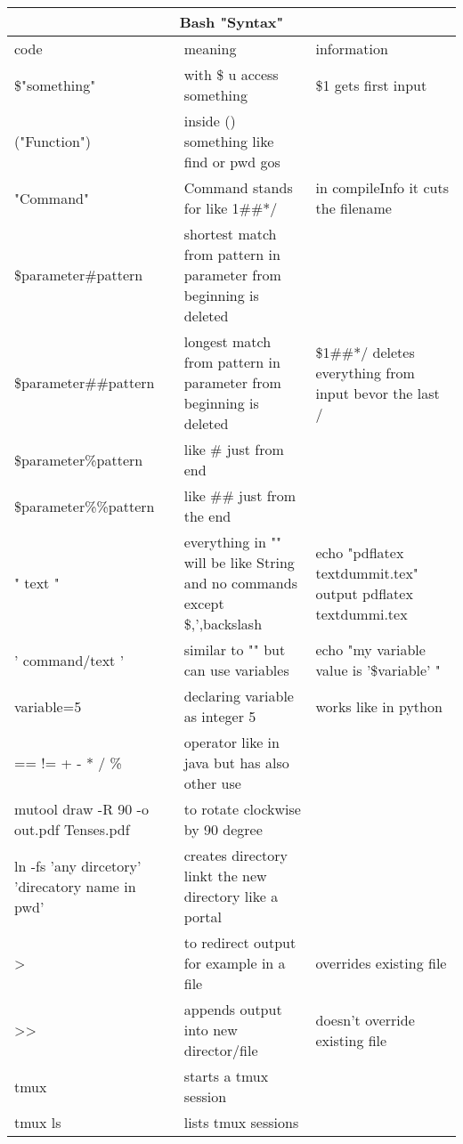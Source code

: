 \documentclass[12pt]{article}
\begin{document}
\centering
\begin{tabular}{| p{6.5cm} | p{6.5cm} | p{6.5cm} |}
    \hline
    \multicolumn{3}{|c|}{Bash "Syntax"} \\
    \hline
    code & meaning & information\\
    \hline
    \$"something" & with \$ u access something & \$1 gets first input\\
    \hline
    ("Function") & inside () something like find or pwd gos &\\
    \hline
    {"Command"} & Command stands for like 1\#\#*/ & in compileInfo it cuts the filename \\
    \hline
    \${parameter\#pattern} & shortest match from pattern in parameter from beginning is deleted &\\
    \hline 
    \${parameter\#\#pattern} & longest match from pattern in parameter from beginning is deleted & \${1\#\#*/} deletes everything from input bevor the last / \\
    \hline
    \${parameter\%pattern} & like \# just from end &\\
    \hline 
    \${parameter\%\%pattern} & like \#\# just from the end &\\
    \hline 
    " text " & everything in "" will be like String and no commands except \$,',backslash & echo "pdflatex textdummit.tex" output pdflatex textdummi.tex \\
    \hline
    ' command/text ' & similar to "" but can use variables & echo "my variable value is '\$variable' " \\
    \hline 
    variable=5 & declaring variable as integer 5 & works like in python \\
    \hline 
    == != + - * / \% & operator like in java but has also other use &\\
    \hline 
    mutool draw -R 90 -o out.pdf Tenses.pdf & to rotate clockwise by 90 degree &\\
    \hline 
    ln -fs 'any dircetory' 'direcatory name in pwd' & creates directory linkt the new directory like a portal & \\
    \hline 
    > & to redirect output for example in a file & overrides existing file \\
    \hline
    >> & appends output into new director/file & doesn't override existing file \\
    \hline
    tmux & starts a tmux session &\\
    \hline
    tmux ls & lists tmux sessions & \\

\end{tabular}
\end{document}
